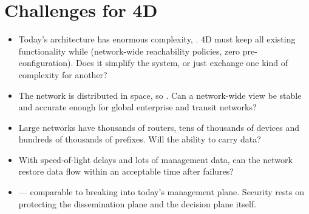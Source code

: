 \section{Challenges for 4D}
\begin{itemize}
\item {} Today's architecture has enormous complexity, . 4D must keep all existing functionality while  (network-wide reachability policies, zero pre-configuration). Does it simplify the system, or just exchange one kind of complexity for another?
\item {} The network is distributed in space, so . Can a network-wide view be stable and accurate enough for global enterprise and transit networks?
\item {} Large networks have thousands of routers, tens of thousands of devices and hundreds of thousands of prefixes.  Will the  ability to carry data?
\item {} With speed-of-light delays and lots of management data, can the network restore data flow within an acceptable time after failures?
\item {}  --- comparable to breaking into today's management plane. Security rests on protecting the dissemination plane and the decision plane itself.
\end{itemize}


